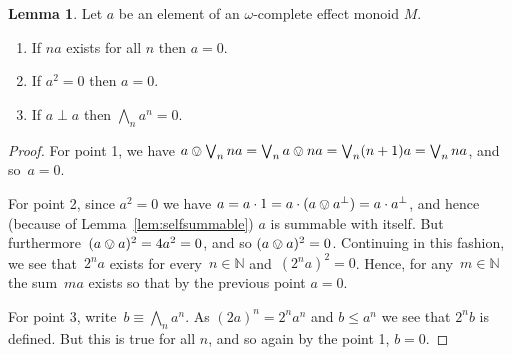 \documentclass[10pt,conference]{IEEEtran}
\newcommand{\N}{\mathbb{N}}
\newcounter{counter}
\theoremstyle{definition}
\newtheorem{lemma}[counter]{Lemma}
\begin{document}
\begin{lemma}\label{lem:archemedeanomegadirectedcomplete}\label{lem:asummablepowerszero}\label{lem:nonilpotents}
    Let $a$ be an element of an $\omega$-complete effect monoid $M$.
    \begin{enumerate}
        \item If $na$ exists for all $n$ then $a=0$.
        \item If $a^2 = 0$ then $a=0$.
        \item If $a\perp a$ then $\bigwedge_n a^n = 0$.
    \end{enumerate}
\end{lemma}
\begin{proof}
    For point 1, we have $a\ovee \bigvee_n na
    =\bigvee_n a\ovee na
    = \bigvee_n (n+1)a = \bigvee_n na$,
    and so~$a=0$.

    For point 2, since $a^2 = 0$ we have $a = a\cdot 1 = a\cdot (a\ovee a^\perp) = a\cdot a^\perp$, and hence (because of
    Lemma~\ref{lem:selfsummable}) $a$ is summable with itself. But
    furthermore~$(a\ovee a)^2 = 4a^2 = 0$, and so $(a\ovee a)^2=0$.
    Continuing in this fashion,
        we see that~$2^n a$ exists for every~$n \in \N$
        and~$(2^n a)^2 = 0$.
        Hence, for any~$m \in \N$
        the sum~$m a$ exists 
    so that by the previous point
    $a = 0$.

    For point 3, write~$b \equiv \bigwedge_n a^n$.
    As $(2a)^n = 2^n a^n$ and $b\leq a^n$ we see that
    $2^n b$ is defined. But this is true for all $n$, and so again by the point 1, $b=0$.
\end{proof}


\end{document}
